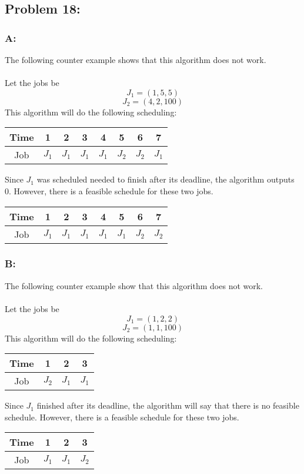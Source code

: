 \documentclass[12pt]{article}
\begin{document}
\subsection*{Problem 18:}
\subsubsection*{A:}
The following counter example shows that this algorithm does not work.\\\\
Let the jobs be
\[
J_1=(1,5,5)
\]
\[
J_2=(4,2,100)
\]
This algorithm will do the following scheduling:\\
\begin{center}
    \begin{tabular}{c|c|c|c|c|c|c|c}
    Time & 1 & 2 & 3 & 4 & 5 & 6 & 7 \\ \hline
    Job & $J_1$ & $J_1$ & $J_1$ & $J_1$ & $J_2$ & $J_2$ & $J_1$ \\
    \end{tabular}
\end{center}  
Since $J_1$ was scheduled needed to finish after its deadline, the algorithm
outputs $0$.  However, there is a feasible schedule for these two jobs.\\
\begin{center}
    \begin{tabular}{c|c|c|c|c|c|c|c}
    Time & 1 & 2 & 3 & 4 & 5 & 6 & 7 \\ \hline
    Job & $J_1$ & $J_1$ & $J_1$ & $J_1$ & $J_1$ & $J_2$ & $J_2$ \\
    \end{tabular}
\end{center}  
\subsubsection*{B:}
The following counter example show that this algorithm does not work.\\\\
Let the jobs be
\[
J_1=(1,2,2)
\]
\[
J_2=(1,1,100)
\]
This algorithm will do the following scheduling:\\
\begin{center}
    \begin{tabular}{c|c|c|c}
    Time & 1 & 2 & 3 \\ \hline
    Job & $J_2$ & $J_1$ & $J_1$ \\
    \end{tabular}
\end{center}
Since $J_1$ finished after its deadline, the algorithm will say that
there is no feasible schedule.  However, there is a feasible schedule for these
two jobs.\\
\begin{center}
    \begin{tabular}{c|c|c|c}
    Time & 1 & 2 & 3 \\ \hline
    Job & $J_1$ & $J_1$ & $J_2$ \\
    \end{tabular}
\end{center}
\end{document}

